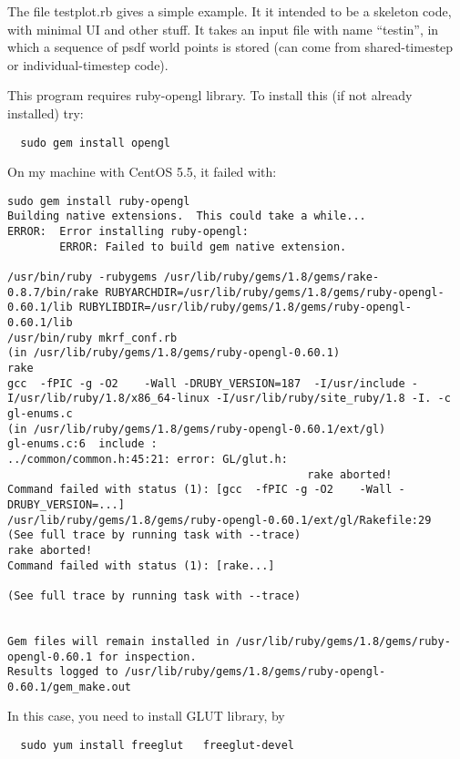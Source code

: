 \documentclass[12pt]{article}
\begin{document}
The file testplot.rb gives a simple example. It it intended to be a
skeleton code, with minimal UI and other stuff. It takes an input file
with name ``testin'', in which a sequence of psdf world points is
stored (can come from shared-timestep or individual-timestep code).

This program requires ruby-opengl library. To install this (if not
already installed) try:
\begin{verbatim}
  sudo gem install opengl
\end{verbatim}
On my machine with CentOS 5.5, it failed with:
\begin{verbatim}
sudo gem install ruby-opengl
Building native extensions.  This could take a while...
ERROR:  Error installing ruby-opengl:
        ERROR: Failed to build gem native extension.

/usr/bin/ruby -rubygems /usr/lib/ruby/gems/1.8/gems/rake-0.8.7/bin/rake RUBYARCHDIR=/usr/lib/ruby/gems/1.8/gems/ruby-opengl-0.60.1/lib RUBYLIBDIR=/usr/lib/ruby/gems/1.8/gems/ruby-opengl-0.60.1/lib
/usr/bin/ruby mkrf_conf.rb
(in /usr/lib/ruby/gems/1.8/gems/ruby-opengl-0.60.1)
rake
gcc  -fPIC -g -O2    -Wall -DRUBY_VERSION=187  -I/usr/include -I/usr/lib/ruby/1.8/x86_64-linux -I/usr/lib/ruby/site_ruby/1.8 -I. -c gl-enums.c
(in /usr/lib/ruby/gems/1.8/gems/ruby-opengl-0.60.1/ext/gl)
gl-enums.c:6  include :
../common/common.h:45:21: error: GL/glut.h: 
                                              rake aborted!
Command failed with status (1): [gcc  -fPIC -g -O2    -Wall -DRUBY_VERSION=...]
/usr/lib/ruby/gems/1.8/gems/ruby-opengl-0.60.1/ext/gl/Rakefile:29
(See full trace by running task with --trace)
rake aborted!
Command failed with status (1): [rake...]

(See full trace by running task with --trace)


Gem files will remain installed in /usr/lib/ruby/gems/1.8/gems/ruby-opengl-0.60.1 for inspection.
Results logged to /usr/lib/ruby/gems/1.8/gems/ruby-opengl-0.60.1/gem_make.out
\end{verbatim}

In this case, you need to install GLUT library, by
\begin{verbatim}
  sudo yum install freeglut   freeglut-devel
\end{verbatim}

    
\end{document}
